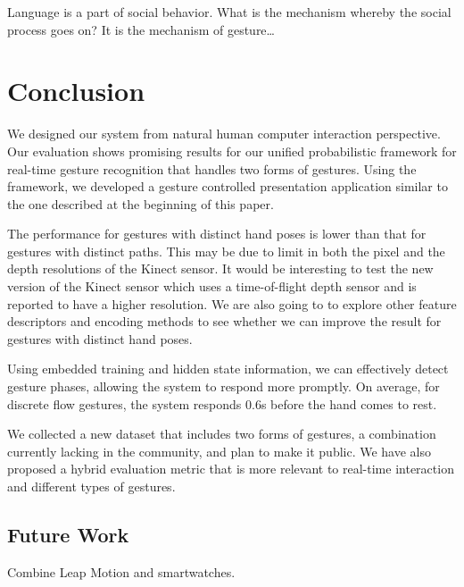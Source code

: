 \begin{savequote}
Language is a part of social behavior. What is the mechanism whereby the social
process goes on? It is the mechanism of gesture\ldots
{}
\end{savequote}
\chapter{Conclusion}
We designed our system from natural human computer interaction perspective.
Our evaluation shows promising results for our unified probabilistic framework
for real-time gesture recognition that handles two forms of gestures. Using the
framework, we developed a gesture controlled presentation application similar to
the one described at the beginning of this paper.

The performance for gestures with distinct hand poses is lower than that for
gestures with distinct paths. This may be due to limit in
both the pixel and the depth resolutions of the Kinect sensor. It would be interesting to test
the new version of the Kinect sensor which uses a time-of-flight depth sensor
and is reported to have a higher resolution. We are also going to to explore
other feature descriptors and encoding methods to see whether we can
improve the result for gestures with distinct hand poses.

Using embedded training and hidden state information, we can effectively
detect gesture phases, allowing the system to respond more promptly. On average,
for discrete flow gestures, the system responds 0.6s before the hand comes to
rest. 

We collected a new dataset that includes two forms of gestures, a
combination currently lacking in the community, and plan to make it
public. We have also proposed a hybrid evaluation metric
that is more relevant to real-time interaction and different types of gestures.

\section{Future Work}
Combine Leap Motion and smartwatches.